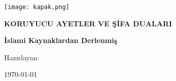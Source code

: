 \documentclass[a4paper,12pt]{book}
\makeatletter
\renewcommand{\cleardoublepage}{\clearpage\if@twoside \ifodd\c@page\else
    \hbox{}\thispagestyle{empty}\newpage\if@twocolumn\hbox{}\newpage\fi\fi\fi}
\makeatother
\begin{document}
\begin{titlepage}
\begin{center}
\vspace*{2cm}
\texttt{[image: kapak.png]}
\vspace{2cm}

{\Huge\bfseries KORUYUCU AYETLER VE ŞİFA DUALARI\par}
\vspace{1cm}
{\Large\bfseries İslami Kaynaklardan Derlenmiş\par}
\vspace{2cm}

{\large Hazırlayan:\\
[Yazar Adı]\par}
\vspace{1cm}
{\large \today\par}
\end{center}
\end{titlepage}

\tableofcontents
\cleardoublepage



\end{document}
